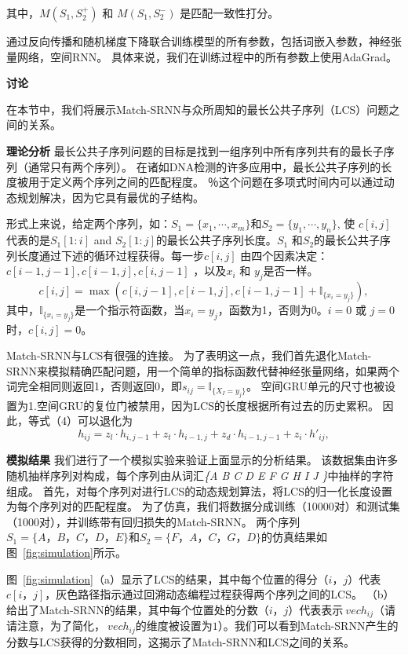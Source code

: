 其中，$M(S_1,S_2^+)$ 和 $M(S_1,S_2^-)$ 是匹配一致性打分。

通过反向传播和随机梯度下降联合训练模型的所有参数，包括词嵌入参数，神经张量网络，空间RNN。 具体来说，我们在训练过程中的所有参数上使用AdaGrad。

\textbf{讨论}

在本节中，我们将展示Match-SRNN与众所周知的最长公共子序列（LCS）问题之间的关系。

\textbf{理论分析}
最长公共子序列问题的目标是找到一组序列中所有序列共有的最长子序列（通常只有两个序列）。 在诸如DNA检测的许多应用中，最长公共子序列的长度被用于定义两个序列之间的匹配程度。 ％这个问题在多项式时间内可以通过动态规划解决，因为它具有最优的子结构。

形式上来说，给定两个序列，如：$S_1{=}\{x_1,\cdots,x_m\}$和$S_2{=}\{y_1,\cdots,y_n\}$, 使 $c[i,j]$ 代表的是$S_1[1{:}i]$ and $S_2[1{:}j]$的最长公共子序列长度。$S_1$ 和$S_2$的最长公共子序列长度通过下述的循环过程获得。每一步$c[i,j]$ 由四个因素决定： $c[i{-}1,j{-}1],c[i{-}1,j],c[i,j{-}1]$ ，以及$x_i$ 和 $y_j$是否一样。
\begin{equation}\label{eq:LCS}
c[i,j]{=}\max(c[i,j{-}1], c[i{-}1,j],c[i{-}1,j{-}1]+\mathbb{I}_{\{x_i=y_j\}}),
\end{equation}
其中，$\mathbb{I}_{\{x_i=y_j\}}$是一个指示符函数，当$x_i=y_j$，函数为1，否则为0。$i{=}0$ 或 $j{=}0$时，$c[i,j]{=}0$。

Match-SRNN与LCS有很强的连接。 为了表明这一点，我们首先退化Match-SRNN来模拟精确匹配问题，用一个简单的指标函数代替神经张量网络，如果两个词完全相同则返回1，否则返回0，即$ s_ {ij} {=}\mathbb{I}_ {\{X_I= y_j\}}$。
空间GRU单元的尺寸也被设置为1.空间GRU的复位门被禁用，因为LCS的长度根据所有过去的历史累积。 因此，等式（4）可以退化为
\[
{h}_{ij}     ={z}_{l}\cdot{h}_{i,j-1}+{z}_{t}\cdot{h}_{i-1,j}+
            		  {z}_{d}\cdot{h}_{i-1,j-1}+{z}_{i}\cdot{h}'_{ij},
\]

\textbf{模拟结果}
我们进行了一个模拟实验来验证上面显示的分析结果。 该数据集由许多随机抽样序列对构成，每个序列由从词汇\textit {\{A B C D E F G H I J \}}中抽样的字符组成。 首先，对每个序列对进行LCS的动态规划算法，将LCS的归一化长度设置为每个序列对的匹配程度。 为了仿真，我们将数据分成训练（10000对）和测试集（1000对），并训练带有回归损失的Match-SRNN。 两个序列$ S_1 = \{A，B，C，D，E \} $和$ S_2 = \{F，A，C，G，D \} $的仿真结果如图~\ref{fig:simulation}所示。

图~\ref{fig:simulation}（a）显示了LCS的结果，其中每个位置的得分$（i，j）$代表$ c [i，j] $，灰色路径指示通过回溯动态编程过程获得两个序列之间的LCS。 （b）给出了Match-SRNN的结果，其中每个位置处的分数$（i，j）$代表表示$ \ vec {h} _ {ij} $（请请注意，为了简化，$ \ vec {h} _ {ij} $的维度被设置为$ 1 $）。我们可以看到Match-SRNN产生的分数与LCS获得的分数相同，这揭示了Match-SRNN和LCS之间的关系。

